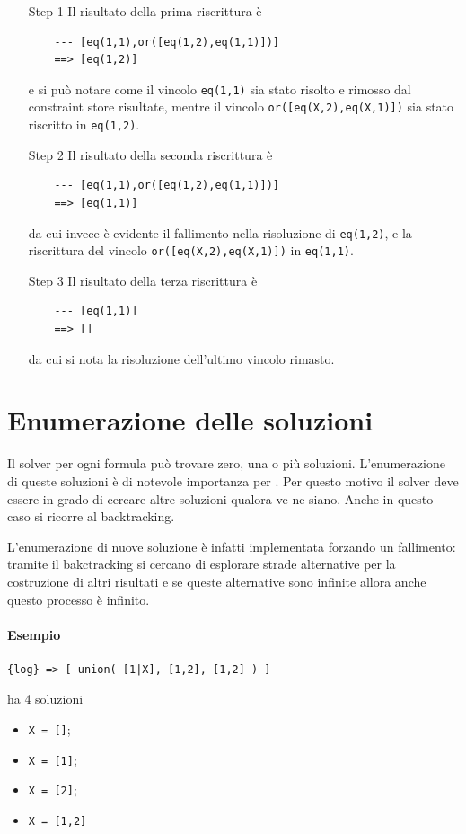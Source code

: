 \documentclass[12pt,a4paper,openright]{book} %
\begin{document}
\begin{itemize}

	\item[Step 1] Il risultato della prima riscrittura è
	\begin{verbatim}
	--- [eq(1,1),or([eq(1,2),eq(1,1)])]
	==> [eq(1,2)]
	\end{verbatim}
	e si può notare come il vincolo \verb|eq(1,1)| sia stato
        risolto e rimosso dal constraint store risultate, mentre il
        vincolo \verb|or([eq(X,2),eq(X,1)])| sia stato riscritto in
        \verb|eq(1,2)|.

	\item[Step 2] Il risultato della seconda riscrittura è
	\begin{verbatim}
	--- [eq(1,1),or([eq(1,2),eq(1,1)])]
	==> [eq(1,1)]
	\end{verbatim}
	da cui invece è evidente il fallimento nella risoluzione di
        \verb|eq(1,2)|, e la riscrittura del vincolo
        \verb|or([eq(X,2),eq(X,1)])| in \verb|eq(1,1)|.

	\item[Step 3] Il risultato della terza riscrittura è
	\begin{verbatim}
	--- [eq(1,1)]
	==> []
	\end{verbatim}
	da cui si nota la risoluzione dell'ultimo vincolo rimasto.

\end{itemize}

\section{Enumerazione delle soluzioni}
\label{sec:lsetpicat_solutions}

Il solver per ogni formula può trovare zero, una o più
soluzioni. L'enumerazione di queste soluzioni è di notevole importanza
per \lset{}. Per questo motivo il solver deve essere in grado di
cercare altre soluzioni qualora ve ne siano. Anche in questo caso si
ricorre al backtracking.

L'enumerazione di nuove soluzione è infatti implementata forzando un
fallimento: tramite il bakctracking si cercano di esplorare strade
alternative per la costruzione di altri risultati e se queste
alternative sono infinite allora anche questo processo è infinito.

\paragraph{Esempio}
\begin{verbatim}
{log} => [ union( [1|X], [1,2], [1,2] ) ]
\end{verbatim}
ha 4 soluzioni
\begin{itemize}
	\item \verb|X = []|;
	\item \verb|X = [1]|;
	\item \verb|X = [2]|;
	\item \verb|X = [1,2]|
\end{itemize}
\end{document}
